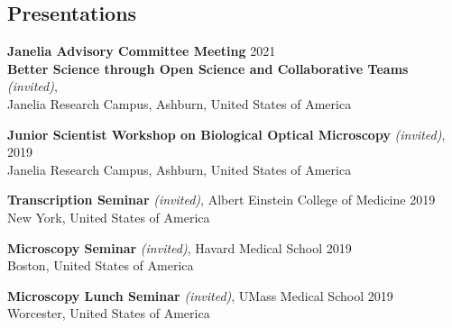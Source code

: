 \documentclass[margin,line]{res}
\begin{document}
\begin{resume}

\section{\sc  Presentations}

{\bf  Janelia Advisory Committee Meeting}  \hfill 2021\\
{\bf Better Science through Open Science and Collaborative Teams}  {\it (invited)}, \\
Janelia Research Campus, Ashburn, United States of America %

\vspace*{-2.5mm}
{\bf  Junior Scientist Workshop on Biological Optical Microscopy} {\it (invited)},  \hfill 2019\\
Janelia Research Campus, Ashburn, United States of America %

\vspace*{-2.5mm}
{\bf  Transcription Seminar} {\it (invited)}, Albert Einstein College of Medicine \hfill 2019\\
 New York, United States of America%

\vspace*{-2.5mm}
{\bf  Microscopy Seminar} {\it (invited)}, Havard Medical School \hfill 2019\\
 Boston, United States of America%

\vspace*{-2.5mm}
{\bf Microscopy Lunch Seminar} {\it (invited)}, UMass Medical School \hfill 2019\\
 Worcester, United States of America%


\end{resume}
\end{document}

